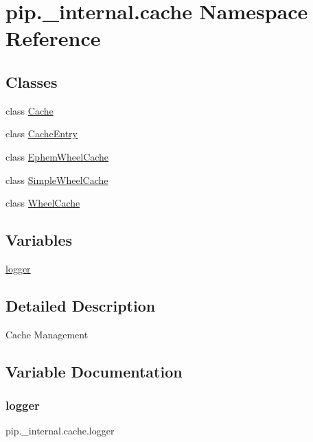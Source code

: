 \hypertarget{namespacepip_1_1__internal_1_1cache}{}\section{pip.\+\_\+internal.\+cache Namespace Reference}
\label{namespacepip_1_1__internal_1_1cache}
\subsection*{Classes}
\begin{DoxyCompactItemize}
\item 
class \hyperlink{classpip_1_1__internal_1_1cache_1_1Cache}{Cache}
\item 
class \hyperlink{classpip_1_1__internal_1_1cache_1_1CacheEntry}{Cache\+Entry}
\item 
class \hyperlink{classpip_1_1__internal_1_1cache_1_1EphemWheelCache}{Ephem\+Wheel\+Cache}
\item 
class \hyperlink{classpip_1_1__internal_1_1cache_1_1SimpleWheelCache}{Simple\+Wheel\+Cache}
\item 
class \hyperlink{classpip_1_1__internal_1_1cache_1_1WheelCache}{Wheel\+Cache}
\end{DoxyCompactItemize}
\subsection*{Variables}
\begin{DoxyCompactItemize}
\item 
\hyperlink{namespacepip_1_1__internal_1_1cache_a287b6f8cc00fd2a97825f2d2770f6273}{logger}
\end{DoxyCompactItemize}


\subsection{Detailed Description}
\begin{DoxyVerb}Cache Management
\end{DoxyVerb}
 

\subsection{Variable Documentation}
\mbox{\label{namespacepip_1_1__internal_1_1cache_a287b6f8cc00fd2a97825f2d2770f6273}} 
\subsubsection{\texorpdfstring{logger}{logger}}
{\footnotesize\ttfamily pip.\+\_\+internal.\+cache.\+logger}

